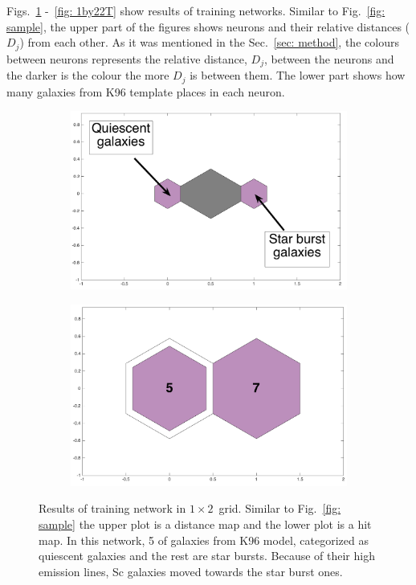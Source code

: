             Figs.~\ref{fig: 1by2T} -~\ref{fig: 1by22T} show results of training networks.
            Similar to Fig.~\ref{fig: sample}, the upper part of the figures shows neurons and their relative distances ($D_j$) from each other.
            As it was mentioned in the Sec.~\ref{sec: method}, the colours between neurons represents the relative distance, $D_j$, between the neurons and the darker is the colour the more $D_j$ is between them.
            The lower part shows how many galaxies from K96 template places in each neuron. 
            \begin{figure}
                \begin{subfigure}[b]{0.5\textwidth}
                    \centering
                    \includegraphics[width=\textwidth]{../images0.01/1d/dist_1_by_2.png}
                \end{subfigure}
                \hfill
                \begin{subfigure}[b]{0.5\textwidth}
                     \includegraphics[width=\textwidth]{../images0.01/1d/hit_t_1_by_2.png}
                \end{subfigure}
                \caption{Results of training network in $1\times2$~grid. Similar to Fig.~\ref{fig: sample} the upper plot is a distance map and the lower plot is a hit map. In this network, 5 of galaxies from K96 model, categorized as quiescent galaxies and the rest are star bursts. Because of their high emission lines, Sc galaxies moved towards the star burst ones.}
                 \label{fig: 1by2T}
            \end{figure}
        
